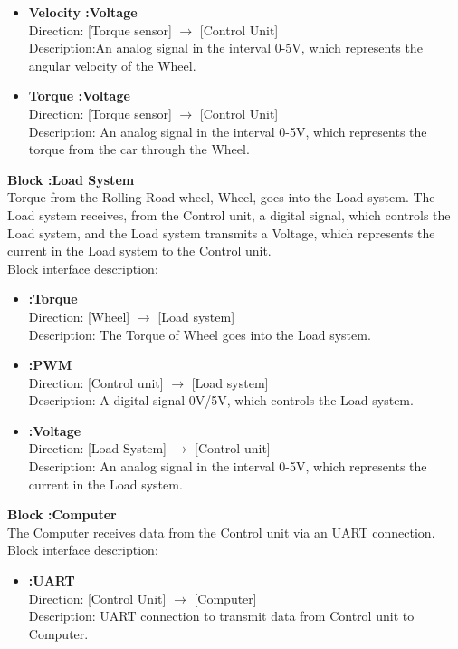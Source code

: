 \begin{itemize}
	\item \textbf{Velocity :Voltage}\\
		Direction: [Torque sensor] $\rightarrow$ [Control Unit]\\
		Description:An analog signal in the interval 0-5V, which represents the angular velocity of the Wheel.
	\item \textbf{Torque :Voltage}\\
		Direction: [Torque sensor] $\rightarrow$ [Control Unit]\\
		Description: An analog signal in the interval 0-5V, which represents the torque from the car through the Wheel.
\end{itemize}

\textbf{Block :Load System}\\
Torque from the Rolling Road wheel, Wheel, goes into the Load system. The Load system receives, from the Control unit, a digital signal, which controls the Load system, and the Load system transmits a Voltage, which represents the current in the Load system to the Control unit.\\
Block interface description:

\begin{itemize}
	\item \textbf{:Torque}\\
		Direction: [Wheel] $\rightarrow$ [Load system]\\
		Description: The Torque of Wheel goes into the Load system.
	\item \textbf{:PWM}\\
		Direction: [Control unit] $\rightarrow$ [Load system]\\
		Description: A digital signal 0V/5V, which controls the Load system.
	\item \textbf{:Voltage}\\
		Direction: [Load System] $\rightarrow$ [Control unit]\\
		Description: An analog signal in the interval 0-5V, which represents the current in the Load system.
\end{itemize}

\textbf{Block :Computer}\\
The Computer receives data from the Control unit via an UART connection.\\
Block interface description:

\begin{itemize}
	\item \textbf{:UART}\\
		Direction: [Control Unit] $\rightarrow$ [Computer]\\
		Description: UART connection to transmit data from Control unit to Computer.
\end{itemize}

